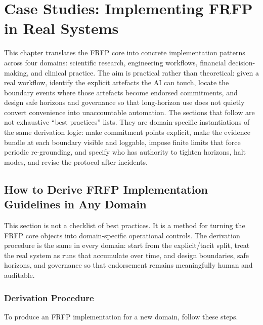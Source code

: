 \chapter{Case Studies: Implementing FRFP in Real Systems}
\label{ch:frfp-implementations}
This chapter translates the FRFP core into concrete implementation patterns across four domains:
scientific research, engineering workflows, financial decision-making, and clinical practice. The aim
is practical rather than theoretical: given a real workflow, identify the explicit artefacts the AI
can touch, locate the boundary events where those artefacts become endorsed commitments, and design
safe horizons and governance so that long-horizon use does not quietly convert convenience into
unaccountable automation. The sections that follow are not exhaustive “best practices” lists. They
are domain-specific instantiations of the same derivation logic: make commitment points explicit,
make the evidence bundle at each boundary visible and loggable, impose finite limits that force
periodic re-grounding, and specify who has authority to tighten horizons, halt modes, and revise the
protocol after incidents.
\section{How to Derive FRFP Implementation Guidelines in Any Domain}
\label{sec:frfp-derive-guidelines}

This section is not a checklist of best practices. It is a method for turning the FRFP core objects
into domain-specific operational controls. The derivation procedure is the same in every domain:
start from the explicit/tacit split, treat the real system as runs that accumulate over time, and
design boundaries, safe horizons, and governance so that endorsement remains meaningfully human and
auditable.

\subsection{Derivation Procedure}

To produce an FRFP implementation for a new domain, follow these steps.

